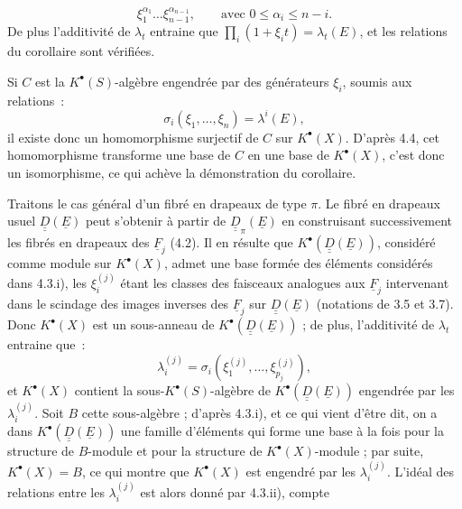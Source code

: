 
\[
  \xi_1^{\alpha_1}\ldots\xi_{n-1}^{\alpha_{n-1}},
  \qquad
\text{avec } 0\le\alpha_i\le n-i.
\]
De plus l'additivité de \(\lambda_t\) entraine que \(\prod_i(1+\xi_i t)=\lambda_t(E)\), et les relations du corollaire sont vérifiées.

Si \(C\) est la \(K^{\bullet}(S)\)-algèbre engendrée par des générateurs \(\xi_i\), soumis aux relations~:
\[
  \sigma_i(\xi_1,\ldots,\xi_n)=\lambda^i(E),
\]
il existe donc un homomorphisme surjectif de \(C\) sur \(K^{\bullet}(X)\). D'après 4.4, cet homomorphisme transforme une base de \(C\) en une base de \(K^{\bullet}(X)\), c'est donc un isomorphisme, ce qui achève la démonstration du corollaire.

Traitons le cas général d'un fibré en drapeaux de type \(\pi\). Le fibré en drapeaux usuel \(\underline{\underline{D}}(\underline{E})\) peut s'obtenir à partir de \(\underline{\underline{D}}_\pi(\underline{E})\) en construisant successivement les fibrés en drapeaux des \(\underline{F}_j\) (4.2). Il en résulte que \(K^{\bullet}(\underline{\underline{D}}(\underline{E}))\), considéré comme module sur \(K^{\bullet}(X)\), admet une base formée des éléments considérés dans 4.3.i), les \(\xi_i^{(j)}\) étant les classes des faisceaux analogues aux \(\underline{F}_j\) intervenant dans le scindage des images inverses des \(\underline{F}_j\) sur \(\underline{\underline{D}}(\underline{E})\) (notations de 3.5 et 3.7). Donc \(K^{\bullet}(X)\) est un sous-anneau de \(K^{\bullet}(\underline{\underline{D}}(\underline{E}))\) ; de plus, l'additivité de \(\lambda_t\) entraine que~:
\[
  \lambda_i^{(j)}=\sigma_i(\xi_1^{(j)},\ldots,\xi_{p_j}^{(j)}),
\]
et \(K^{\bullet}(X)\) contient la sous-\(K^{\bullet}(S)\)-algèbre de \(K^{\bullet}(\underline{\underline{D}}(\underline{E}))\) engendrée par les \(\lambda_i^{(j)}\). Soit \(B\) cette sous-algèbre ; d'après 4.3.i), et ce qui vient d'être dit, on a dans \(K^{\bullet}(\underline{\underline{D}}(\underline{E}))\) une famille d'éléments qui forme une base à la fois pour la structure de \(B\)-module et pour la structure de \(K^{\bullet}(X)\)-module ; par suite, \(K^{\bullet}(X)=B\), ce qui montre que \(K^{\bullet}(X)\) est engendré par les \(\lambda_i^{(j)}\). L'idéal des relations entre les \(\lambda_i^{(j)}\) est alors donné par 4.3.ii), compte
